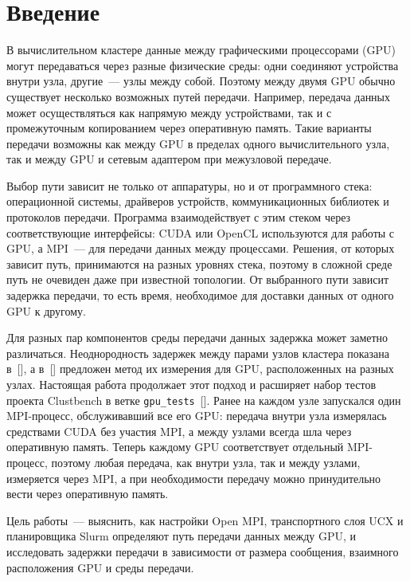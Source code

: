 
\section*{Введение}

В вычислительном кластере данные между графическими процессорами (GPU) могут передаваться через разные физические среды: одни соединяют устройства внутри узла, другие~--- узлы между собой. Поэтому между двумя GPU обычно существует несколько возможных путей передачи. Например, передача данных может осуществляться как напрямую между устройствами, так и с промежуточным копированием через оперативную память. Такие варианты передачи возможны как между GPU в пределах одного вычислительного узла, так и между GPU и сетевым адаптером при межузловой передаче.

Выбор пути зависит не только от аппаратуры, но и от программного стека: операционной системы, драйверов устройств, коммуникационных библиотек и протоколов передачи. Программа взаимодействует с этим стеком через соответствующие интерфейсы: CUDA или OpenCL используются для работы с GPU, а MPI~--- для передачи данных между процессами. Решения, от которых зависит путь, принимаются на разных уровнях стека, поэтому в сложной среде путь не очевиден даже при известной топологии. От выбранного пути зависит задержка передачи, то есть время, необходимое для доставки данных от одного GPU к другому.

Для разных пар компонентов среды передачи данных задержка может заметно различаться. Неоднородность задержек между парами узлов кластера показана в~[], а в~[] предложен метод их измерения для GPU, расположенных на разных узлах. Настоящая работа продолжает этот подход и расширяет набор тестов проекта Clustbench в ветке \texttt{gpu\_tests}~[]. Ранее на каждом узле запускался один MPI-процесс, обслуживавший все его GPU: передача внутри узла измерялась средствами CUDA без участия MPI, а между узлами всегда шла через оперативную память. Теперь каждому GPU соответствует отдельный MPI-процесс, поэтому любая передача, как внутри узла, так и между узлами, измеряется через MPI, а при необходимости передачу можно принудительно вести через оперативную память.

Цель работы~--- выяснить, как настройки Open MPI, транспортного слоя UCX и планировщика Slurm определяют путь передачи данных между GPU, и исследовать задержки передачи в зависимости от размера сообщения, взаимного расположения GPU и среды передачи.

